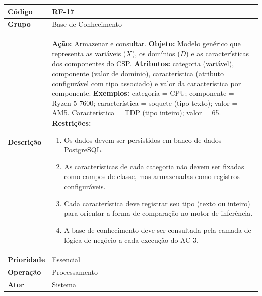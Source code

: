 \FloatBarrier
\begin{quadro}[htb]
  \caption{RF-17 -- Armazenar e consultar a base de conhecimento do CSP}
  \label{quad:rf17}
  \begin{tabular}{|p{3.2cm}|p{11.8cm}|}
    \hline
    \textbf{Código}     & RF-17                                                                                                            \\ \hline
    \textbf{Grupo}      & Base de Conhecimento                                                                                             \\ \hline
    \textbf{Descrição}  &
    \textbf{Ação:} Armazenar e consultar.
    \textbf{Objeto:} Modelo genérico que representa as variáveis ($X$), os domínios ($D$) e as características dos componentes do CSP.
    \textbf{Atributos:} categoria (variável), componente (valor de domínio), característica (atributo configurável com tipo associado) e valor da característica por componente.
    \textbf{Exemplos:} categoria = CPU; componente = Ryzen 5 7600; característica = soquete (tipo texto); valor = AM5. Característica = TDP (tipo inteiro); valor = 65.
    \textbf{Restrições:}
    \begin{enumerate}[nosep,leftmargin=1.2em,topsep=2pt,partopsep=0pt,parsep=0pt,itemsep=1pt]
      \item Os dados devem ser persistidos em banco de dados PostgreSQL.
      \item As características de cada categoria não devem ser fixadas como campos de classe, mas armazenadas como registros configuráveis.
      \item Cada característica deve registrar seu tipo (texto ou inteiro) para orientar a forma de comparação no motor de inferência.
      \item A base de conhecimento deve ser consultada pela camada de lógica de negócio a cada execução do AC-3.
    \end{enumerate} \\ \hline
    \textbf{Prioridade} & Essencial                                                                                                        \\ \hline
    \textbf{Operação}   & Processamento                                                                                                    \\ \hline
    \textbf{Ator}       & Sistema                                                                                                          \\ \hline
  \end{tabular}
\end{quadro}

